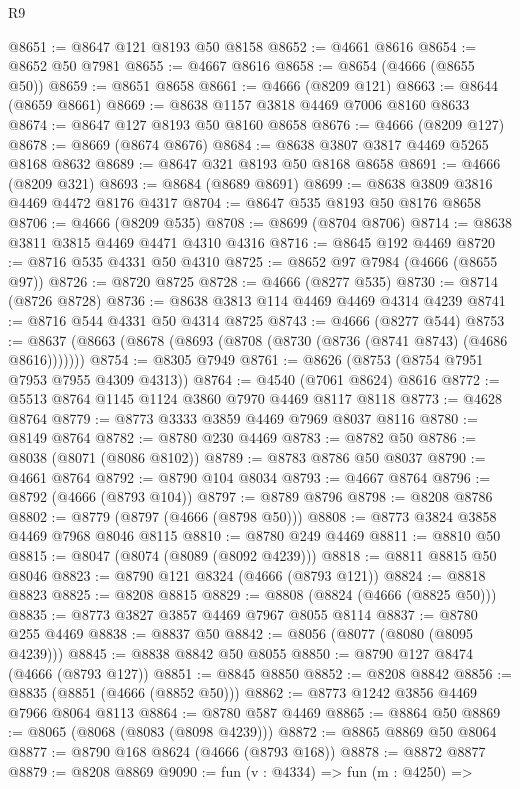 \begin{lexlean}{R9}
\begin{coremodule}
@8651 := @8647 @121 @8193 @50 @8158
@8652 := @4661 @8616
@8654 := @8652 @50 @7981
@8655 := @4667 @8616
@8658 := @8654 (@4666 (@8655 @50))
@8659 := @8651 @8658
@8661 := @4666 (@8209 @121)
@8663 := @8644 (@8659 @8661)
@8669 := @8638 @1157 @3818 @4469 @7006 @8160 @8633
@8674 := @8647 @127 @8193 @50 @8160 @8658
@8676 := @4666 (@8209 @127)
@8678 := @8669 (@8674 @8676)
@8684 := @8638 @3807 @3817 @4469 @5265 @8168 @8632
@8689 := @8647 @321 @8193 @50 @8168 @8658
@8691 := @4666 (@8209 @321)
@8693 := @8684 (@8689 @8691)
@8699 := @8638 @3809 @3816 @4469 @4472 @8176 @4317
@8704 := @8647 @535 @8193 @50 @8176 @8658
@8706 := @4666 (@8209 @535)
@8708 := @8699 (@8704 @8706)
@8714 := @8638 @3811 @3815 @4469 @4471 @4310 @4316
@8716 := @8645 @192 @4469
@8720 := @8716 @535 @4331 @50 @4310
@8725 := @8652 @97 @7984 (@4666 (@8655 @97))
@8726 := @8720 @8725
@8728 := @4666 (@8277 @535)
@8730 := @8714 (@8726 @8728)
@8736 := @8638 @3813 @114 @4469 @4469 @4314 @4239
@8741 := @8716 @544 @4331 @50 @4314 @8725
@8743 := @4666 (@8277 @544)
@8753 := @8637 (@8663 (@8678 (@8693 (@8708 (@8730 (@8736 (@8741 @8743) (@4686 @8616)))))))
@8754 := @8305 @7949
@8761 := @8626 (@8753 (@8754 @7951 @7953 @7955 @4309 @4313))
@8764 := @4540 (@7061 @8624) @8616
@8772 := @5513 @8764 @1145 @1124 @3860 @7970 @4469 @8117 @8118
@8773 := @4628 @8764
@8779 := @8773 @3333 @3859 @4469 @7969 @8037 @8116
@8780 := @8149 @8764
@8782 := @8780 @230 @4469
@8783 := @8782 @50
@8786 := @8038 (@8071 (@8086 @8102))
@8789 := @8783 @8786 @50 @8037
@8790 := @4661 @8764
@8792 := @8790 @104 @8034
@8793 := @4667 @8764
@8796 := @8792 (@4666 (@8793 @104))
@8797 := @8789 @8796
@8798 := @8208 @8786
@8802 := @8779 (@8797 (@4666 (@8798 @50)))
@8808 := @8773 @3824 @3858 @4469 @7968 @8046 @8115
@8810 := @8780 @249 @4469
@8811 := @8810 @50
@8815 := @8047 (@8074 (@8089 (@8092 @4239)))
@8818 := @8811 @8815 @50 @8046
@8823 := @8790 @121 @8324 (@4666 (@8793 @121))
@8824 := @8818 @8823
@8825 := @8208 @8815
@8829 := @8808 (@8824 (@4666 (@8825 @50)))
@8835 := @8773 @3827 @3857 @4469 @7967 @8055 @8114
@8837 := @8780 @255 @4469
@8838 := @8837 @50
@8842 := @8056 (@8077 (@8080 (@8095 @4239)))
@8845 := @8838 @8842 @50 @8055
@8850 := @8790 @127 @8474 (@4666 (@8793 @127))
@8851 := @8845 @8850
@8852 := @8208 @8842
@8856 := @8835 (@8851 (@4666 (@8852 @50)))
@8862 := @8773 @1242 @3856 @4469 @7966 @8064 @8113
@8864 := @8780 @587 @4469
@8865 := @8864 @50
@8869 := @8065 (@8068 (@8083 (@8098 @4239)))
@8872 := @8865 @8869 @50 @8064
@8877 := @8790 @168 @8624 (@4666 (@8793 @168))
@8878 := @8872 @8877
@8879 := @8208 @8869
@9090 := fun (v : @4334) =>
  fun (m : @4250) =>

\end{coremodule}
\end{lexlean}

